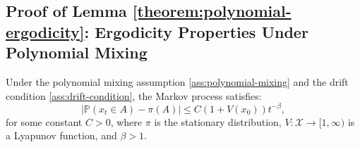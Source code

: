 \subsection{Proof of Lemma \ref{theorem:polynomial-ergodicity}: Ergodicity Properties Under Polynomial Mixing}
\label{app:proof-polynomial-ergodicity}

\begin{theoremapp*}
Under the polynomial mixing assumption \ref{ass:polynomial-mixing} and the drift condition \ref{ass:drift-condition}, the Markov process satisfies:
\[
|\mathbb{P}(x_t \in A) - \pi(A)| \leq C (1 + V(x_0)) t^{-\beta},
\]
for some constant \( C > 0 \), where \( \pi \) is the stationary distribution, \( V: \mathcal{X} \to [1,\infty) \) is a Lyapunov function, and \( \beta > 1 \).
\end{theoremapp*}

